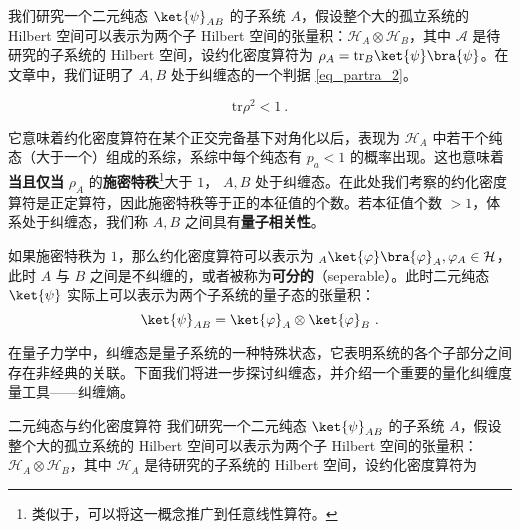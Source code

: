 

我们研究一个二元纯态 $\ket{\psi}_{AB}$ 的子系统 $A$，假设整个大的孤立系统的 Hilbert 空间可以表示为两个子 Hilbert 空间的张量积：$\mathcal{H}_A\otimes \mathcal{H}_B$，其中 $\mathcal A$ 是待研究的子系统的 Hilbert 空间，设约化密度算符为 $\rho_A=\text{tr}_B \ket{\psi}\bra{\psi}$。在文章中，我们证明了 $A,B$ 处于纠缠态的一个判据 \autoref{eq_partra_2}。

\begin{equation}
\text{tr} \rho^2 <1~.
\end{equation}

它意味着约化密度算符在某个正交完备基下对角化以后，表现为 $\mathcal{H}_A$ 中若干个纯态（大于一个）组成的系综，系综中每个纯态有 $p_a<1$ 的概率出现。这也意味着\textbf{当且仅当} $\rho_A$ 的\textbf{施密特秩}\footnote{类似于，可以将这一概念推广到任意线性算符。}大于 $1$， $A,B$ 处于纠缠态。在此处我们考察的约化密度算符是正定算符，因此施密特秩等于正的本征值的个数。若本征值个数 $>1$，体系处于纠缠态，我们称 $A,B$ 之间具有\textbf{量子相关性}。

如果施密特秩为 $1$，那么约化密度算符可以表示为 ${}_A\ket{\varphi}\bra{\varphi}_A,\varphi_A\in \mathcal{H}$，此时 $A$ 与 $B$ 之间是不纠缠的，或者被称为\textbf{可分的}（seperable）。此时二元纯态 $\ket{\psi}$ 实际上可以表示为两个子系统的量子态的张量积：
\begin{equation}
\ket{\psi}_{AB}=\ket{\varphi}_A\otimes \ket{\varphi}_B~.
\end{equation}

在量子力学中，纠缠态是量子系统的一种特殊状态，它表明系统的各个子部分之间存在非经典的关联。下面我们将进一步探讨纠缠态，并介绍一个重要的量化纠缠度量工具——纠缠熵。

二元纯态与约化密度算符
我们研究一个二元纯态 $\ket{\psi}_{AB}$ 的子系统 $A$，假设整个大的孤立系统的 Hilbert 空间可以表示为两个子 Hilbert 空间的张量积：$\mathcal{H}_A \otimes \mathcal{H}_B$，其中 $\mathcal{H}_A$ 是待研究的子系统的 Hilbert 空间，设约化密度算符为